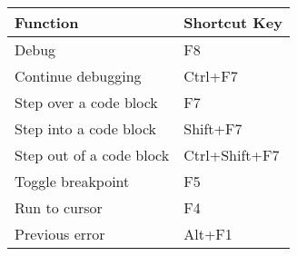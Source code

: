 \begin{tabular}{|l|l|}\hline
Function 	                &	Shortcut Key\\ \hline
Debug 	                    &   F8\\ \hline
Continue debugging 	        &   Ctrl+F7\\ \hline
Step over a code block 	    &   F7\\ \hline
Step into a code block 	    &   Shift+F7\\ \hline
Step out of a code block 	&   Ctrl+Shift+F7\\ \hline
Toggle breakpoint 	        &   F5\\ \hline
Run to cursor 	            &   F4\\ \hline
Previous error 	            &   Alt+F1\\ \hline
\end{tabular}
